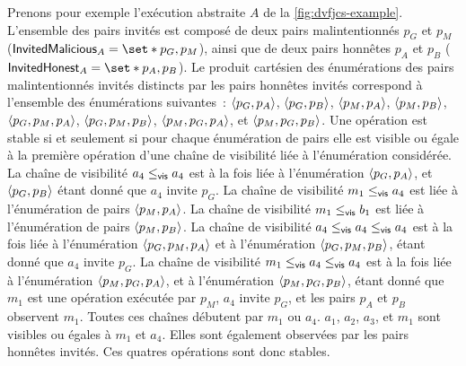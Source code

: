Prenons pour exemple l'exécution abstraite $A$ de la \autoref{fig:dvfjcs-example}.
L'ensemble des pairs invités est composé de deux pairs malintentionnés $p_G$ et $p_M$ ($\trm{InvitedMalicious}_A = \set*{p_G, p_M}$), ainsi que de deux pairs honnêtes $p_A$ et $p_B$ ($\trm{InvitedHonest}_A = \set*{p_A, p_B}$).
Le produit cartésien des énumérations des pairs malintentionnés invités distincts par les pairs honnêtes invités correspond à l'ensemble des énumérations suivantes~: $\tuple*{p_G, p_A}$, $\tuple*{p_G, p_B}$, $\tuple*{p_M, p_A}$, $\tuple*{p_M, p_B}$, $\tuple*{p_G, p_M, p_A}$, $\tuple*{p_G, p_M, p_B}$, $\tuple*{p_M, p_G, p_A}$, et $\tuple*{p_M, p_G, p_B}$.
Une opération est stable si et seulement si pour chaque énumération de pairs elle est visible ou égale à la première opération d'une chaîne de visibilité liée à l'énumération considérée.
La chaîne de visibilité $a_4 \viseq a_4$ est à la fois liée à l'énumération $\tuple*{p_G, p_A}$, et $\tuple*{p_G, p_B}$ étant donné que $a_4$ invite $p_G$.
La chaîne de visibilité $m_1 \viseq a_4$ est liée à l'énumération de pairs $\tuple*{p_M, p_A}$.
La chaîne de visibilité $m_1 \viseq b_1$ est liée à l'énumération de pairs $\tuple*{p_M, p_B}$.
La chaîne de visibilité $a_4 \viseq a_4 \viseq a_4$ est à la fois liée à l'énumération $\tuple*{p_G, p_M, p_A}$ et à l'énumération $\tuple*{p_G, p_M, p_B}$, étant donné que $a_4$ invite $p_G$.
La chaîne de visibilité $m_1 \viseq a_4 \viseq a_4$ est à la fois liée à l'énumération $\tuple*{p_M, p_G, p_A}$, et à l'énumération $\tuple*{p_M, p_G, p_B}$, étant donné que $m_1$ est une opération exécutée par $p_M$, $a_4$ invite $p_G$, et les pairs $p_A$ et $p_B$ observent $m_1$.
Toutes ces chaînes débutent par $m_1$ ou $a_4$.
$a_1$, $a_2$, $a_3$, et $m_1$ sont visibles ou égales à $m_1$ et $a_4$.
Elles sont également observées par les pairs honnêtes invités.
Ces quatres opérations sont donc stables.



